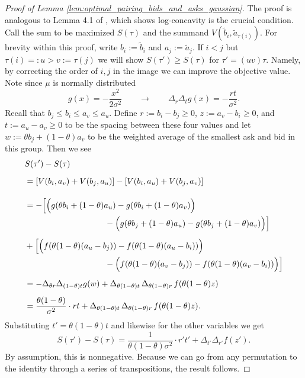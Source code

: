 \begin{subappendices}
\begin{proof}[Proof of Lemma \ref{lem:optimal_pairing_bids_and_asks_gaussian}]
    The proof is analogous to Lemma 4.1 of \cite{bobkov2009_one_dimensional_measures_kantorovich}, which shows log-concavity is the crucial condition. Call the sum to be maximized $S(\tau)$ and the summand $V(\widetilde b_i,\widetilde a_{\tau(i)})$. For brevity within this proof, write $b_i:=\widetilde b_i$ and $a_j:=\widetilde a_j$. If $i < j$ but $\tau(i) =: u > v := \tau(j)$ we will show $S(\tau') \geq S(\tau)$ for $\tau' = (uv) \tau$. Namely, by correcting the order of $i,j$ in the image we can improve the objective value. Note since $\mu$ is normally distributed
    \[ g(x) = -\frac{x^2}{2\sigma^2} \qquad \to \qquad  \Delta_r \Delta_t g(x) = - \frac{rt}{\sigma^2}. \]
    \noindent  Recall that $b_j \leq b_i \leq a_v \leq a_u$. Define $r := b_i - b_j \geq 0$, $z := a_v - b_i \geq 0$, and $t := a_u - a_v \geq 0$ to be the spacing between these four values and let $w := \theta b_j + (1-\theta)a_v$ to be the weighted average of the smallest ask and bid in this group. Then we see
    \begin{align*}
        & S(\tau') - S(\tau) \\[6pt]
        & = \left[ V(b_i, a_v) + V(b_j, a_u) \right] - \left[ V(b_i, a_u) + V(b_j, a_v) \right] \\[1em]
        & = - \Big[ \Big(g(\theta b_i + (1-\theta) a_u) - g(\theta b_i + (1-\theta) a_v) \Big) \\
        &\hspace{3.4cm} - \Big(g(\theta b_j + (1-\theta) a_u) - g(\theta b_j + (1-\theta) a_v) \Big) \Big] \\[5pt]
        & + \Big[ \Big(f(\theta(1-\theta)(a_u - b_j)) - f(\theta(1-\theta)(a_u - b_i)) \Big) \\
        &\hspace{3.4cm} - \Big(f(\theta(1-\theta)(a_v - b_j)) - f(\theta(1-\theta)(a_v - b_i)) \Big) \Big] \\[5pt]
        & = -\Delta_{\theta r} \Delta_{(1-\theta)t} g(w) + \Delta_{\theta(1-\theta) t} \, \Delta_{\theta(1-\theta) r} \, f(\theta(1-\theta) z) \\[5pt]
        & = \frac{\theta (1-\theta)}{\sigma^2} \cdot rt + \Delta_{\theta(1-\theta) t} \, \Delta_{\theta(1-\theta) r} \, f(\theta(1-\theta) z).
    \end{align*}
    \noindent Substituting $t' = \theta(1-\theta)t$ and likewise for the other variables we get
    \[S(\tau') - S(\tau) = \frac{1}{\theta(1-\theta)\sigma^2} \cdot r't' + \Delta_{t'} \Delta_{r'} f(z').\]
    \noindent By assumption, this is nonnegative. Because we can go from any permutation to the identity through a series of transpositions, the result follows.
\end{proof}


\end{subappendices}
